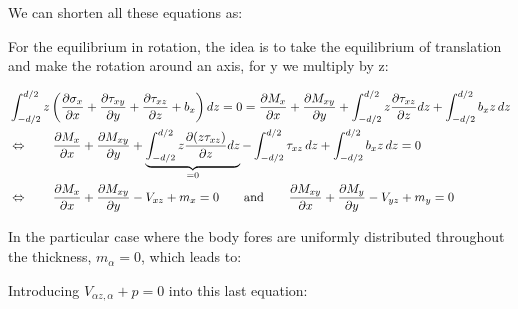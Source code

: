 	We can shorten all these equations as: 
	
	\begin{center}
	\end{center}
	
	For the equilibrium in rotation, the idea is to take the equilibrium of translation and make the rotation around an axis, for y we multiply by z: 
	
	\begin{equation}
	\begin{aligned}
	&\int _{-d/2}^{d/2} z \left( \frac{\partial \sigma _x}{\partial x} + \frac{\partial \tau _{xy}}{\partial y} + \frac{\partial \tau _{xz}}{\partial z} + b_x\right)dz = 0 = \frac{\partial M_x}{\partial x} + \frac{\partial M_{xy}}{\partial y} + \int _{-d/2}^{d/2} z \frac{\partial \tau _{xz}}{\partial z} dz + \int _{-d/2}^{d/2} b_x z \, dz \\
	&\Leftrightarrow \qquad \frac{\partial M_x}{\partial x} + \frac{\partial M_{xy}}{\partial y} + \underbrace{\int _{-d/2}^{d/2} z \frac{\partial (z\tau _{xz})}{\partial z} dz}_{=0} - \int_{-d/2}^{d/2} \tau _{xz} \, dz + \int _{-d/2}^{d/2} b_x z \, dz  = 0 \\
	& \Leftrightarrow \qquad \frac{\partial M_x}{\partial x} + \frac{\partial M_{xy}}{\partial y} - V_{xz} + m_x = 0 \qquad \mbox{and} \qquad \frac{\partial M_{xy}}{\partial x} + \frac{\partial M_{y}}{\partial y} - V_{yz} + m_y = 0
	\end{aligned}
	\end{equation}
	
	In the particular case where the body fores are uniformly distributed throughout the thickness, $m_\alpha = 0$, which leads to: 
	
	\begin{center}
	\end{center}
	
	Introducing $V_{\alpha z,\alpha} + p = 0$ into this last equation: 
	
	\begin{center}
	\end{center}
	
